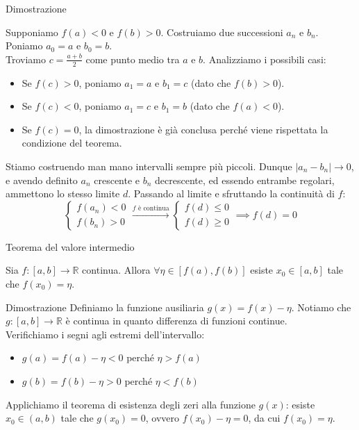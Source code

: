 \documentclass[12pt]{report}
\newcommand{\R}{\mathbb{R}}
\begin{document}
	\begin{dimostrazione}{Dimostrazione}{}
		
		Supponiamo $f(a) < 0$ e $f(b) > 0$. Costruiamo due successioni $a_n$ e $b_n$. Poniamo $a_0 = a$ e $b_0 = b$.\\
		Troviamo $c = \frac{a+b}{2}$ come punto medio tra $a$ e $b$. Analizziamo i possibili casi:
		\begin{itemize}
			\item Se $f(c) > 0$, poniamo $a_1 = a$ e $b_1 = c$ (dato che $f(b) > 0$).
			\item Se $f(c) < 0$, poniamo $a_1 = c$ e $b_1 = b$ (dato che $f(a) < 0$).
			\item Se $f(c) = 0$, la dimostrazione è già conclusa perché viene rispettata la condizione del teorema.
		\end{itemize}
		Stiamo costruendo man mano intervalli sempre più piccoli. Dunque $|a_n - b_n| \to 0$, e avendo definito $a_n$ crescente e $b_n$ decrescente, ed essendo entrambe regolari, ammettono lo stesso limite $d$.
		Passando al limite e sfruttando la continuità di $f$:
		\[
		\begin{cases}
			f(a_n) < 0 \\
			f(b_n) > 0
		\end{cases}
		\xrightarrow{f \text{ è continua}}
		\begin{cases}
			f(d) \leq 0 \\
			f(d) \geq 0
		\end{cases}
		\implies f(d) = 0
		\]
		
	\end{dimostrazione}
	
	\begin{teorema}{Teorema del valore intermedio}{}
		
		Sia $f: [a, b] \to \R$ continua.
		Allora $\forall \eta \in [f(a), f(b)]$ esiste $x_0 \in [a, b]$ tale che $f(x_0) = \eta$.
		
	\end{teorema}
	
	\begin{dimostrazione}{Dimostrazione}{}
		Definiamo la funzione ausiliaria $g(x) = f(x) - \eta$. Notiamo che $g: [a, b] \to \R$ è continua in quanto differenza di funzioni continue.\\
		Verifichiamo i segni agli estremi dell'intervallo:
		\begin{itemize}
			\item $g(a) = f(a) - \eta < 0$ perché $\eta > f(a)$
			\item $g(b) = f(b) - \eta > 0$ perché $\eta < f(b)$
		\end{itemize}
		Applichiamo il teorema di esistenza degli zeri alla funzione $g(x)$: esiste $x_0 \in (a, b)$ tale che $g(x_0) = 0$, ovvero $f(x_0) - \eta = 0$, da cui $f(x_0) = \eta$.
	\end{dimostrazione}
	
\end{document}
